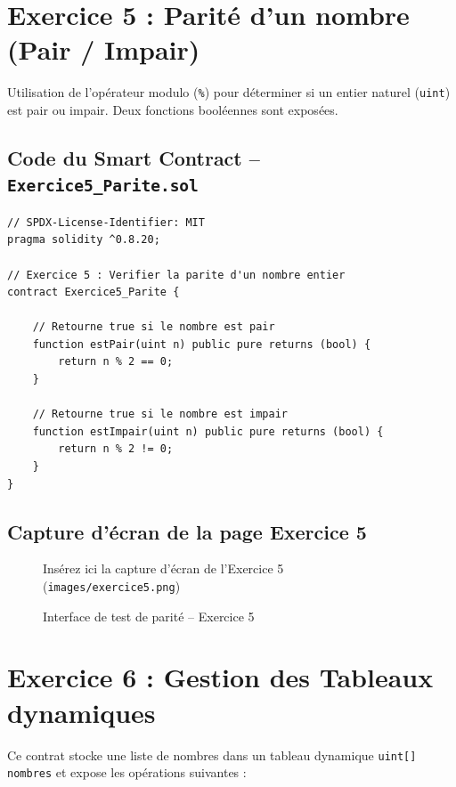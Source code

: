 \documentclass[12pt,a4paper]{report}
\begin{document}
\newpage

\section{Exercice 5 : Parité d'un nombre (Pair / Impair)}
Utilisation de l'opérateur modulo (\texttt{\%}) pour déterminer si un entier naturel
(\texttt{uint}) est pair ou impair. Deux fonctions booléennes sont exposées.

\subsection{Code du Smart Contract -- \texttt{Exercice5\_Parite.sol}}
\begin{lstlisting}[language=Solidity, caption={Contrat Parite.sol -- opérateur modulo}]
// SPDX-License-Identifier: MIT
pragma solidity ^0.8.20;

// Exercice 5 : Verifier la parite d'un nombre entier
contract Exercice5_Parite {

    // Retourne true si le nombre est pair
    function estPair(uint n) public pure returns (bool) {
        return n % 2 == 0;
    }

    // Retourne true si le nombre est impair
    function estImpair(uint n) public pure returns (bool) {
        return n % 2 != 0;
    }
}
\end{lstlisting}

\subsection{Capture d'écran de la page Exercice 5}
\begin{figure}[h!]
    \centering
    \begin{tcolorbox}[colback=red!5,colframe=red!50!black,title=Capture d'écran manquante]
        Insérez ici la capture d'écran de l'Exercice 5 (\texttt{images/exercice5.png})
    \end{tcolorbox}
    \caption{Interface de test de parité -- Exercice 5}
\end{figure}

\newpage

\section{Exercice 6 : Gestion des Tableaux dynamiques}
Ce contrat stocke une liste de nombres dans un tableau dynamique \texttt{uint[] nombres}
et expose les opérations suivantes :
\end{document}
